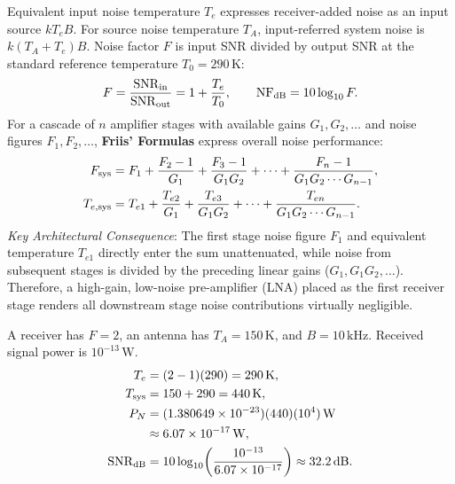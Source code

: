 \documentclass[12pt,a4paper]{article}
\begin{document}
Equivalent input noise temperature $T_e$ expresses receiver-added noise as an input source $kT_eB$. For source noise temperature $T_A$, input-referred system noise is $k(T_A+T_e)B$. Noise factor $F$ is input SNR divided by output SNR at the standard reference temperature $T_0=290\,\mathrm K$:
\[
 F=\frac{\mathrm{SNR}_{\rm in}}{\mathrm{SNR}_{\rm out}}=1+\frac{T_e}{T_0},\qquad \mathrm{NF}_{\rm dB}=10\log_{10}F.
\]
For a cascade of $n$ amplifier stages with available gains $G_1, G_2, \dots$ and noise figures $F_1, F_2, \dots$, \textbf{Friis' Formulas} express overall noise performance:
\[
\begin{aligned}
 F_{\rm sys} &= F_1 + \frac{F_2 - 1}{G_1} + \frac{F_3 - 1}{G_1 G_2} + \dots + \frac{F_n - 1}{G_1 G_2 \cdots G_{n-1}},\\
 T_{e,\rm sys} &= T_{e1} + \frac{T_{e2}}{G_1} + \frac{T_{e3}}{G_1 G_2} + \dots + \frac{T_{en}}{G_1 G_2 \cdots G_{n-1}}.
\end{aligned}
\]
\textit{Key Architectural Consequence}: The first stage noise figure $F_1$ and equivalent temperature $T_{e1}$ directly enter the sum unattenuated, while noise from subsequent stages is divided by the preceding linear gains ($G_1, G_1G_2, \dots$). Therefore, a high-gain, low-noise pre-amplifier (LNA) placed as the first receiver stage renders all downstream stage noise contributions virtually negligible.

\begin{tcolorbox}[examplebox, title={Noise Temperature and Input-Referred SNR}]
A receiver has $F=2$, an antenna has $T_A=150\,\mathrm K$, and $B=10\,\mathrm{kHz}$. Received signal power is $10^{-13}\,\mathrm W$.
\[
\begin{aligned}
 T_e&=(2-1)(290)=290\,\mathrm K,\\
 T_{\rm sys}&=150+290=440\,\mathrm K,\\
 P_N&=(1.380649\times10^{-23})(440)(10^4)\,\mathrm W\\
    &\approx6.07\times10^{-17}\,\mathrm W,\\
 \mathrm{SNR}_{\rm dB}&=10\log_{10}\!\left(\frac{10^{-13}}{6.07\times10^{-17}}\right)
             \approx32.2\,\mathrm{dB}.
\end{aligned}
\]
\end{tcolorbox}
\end{document}

